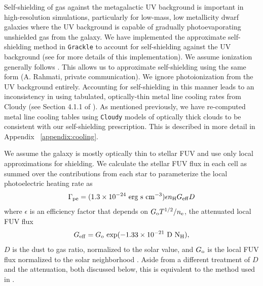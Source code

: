 \documentclass[twocolumn]{aastex61}
\begin{document}
Self-shielding of gas against the metagalactic UV background is important in high-resolution simulations, particularly for low-mass, low metallicity dwarf galaxies where the UV background is capable of gradually photoevaporating unshielded gas from the galaxy. We have implemented the \citet{Rahmati2013} approximate self-shielding method in \texttt{Grackle} to account for  self-shielding against the UV background (see \citep{GrackleMethod} for more details of this implementation). We assume  ionization generally follows . This allows us to approximate  self-shielding using the same form (A. Rahmati, private communication). We ignore  photoionization from the UV background entirely. Accounting for self-shielding in this manner leads to an inconsistency in using tabulated, optically-thin metal line cooling rates from Cloudy (see Section 4.1.1 of \citet{Hu2017}). As mentioned previously, we have re-computed metal line cooling tables using \texttt{Cloudy} models of optically thick clouds to be consistent with our self-shielding prescription. This is described in more detail in Appendix ~\ref{appendix:cooling}. 


We assume the galaxy is mostly optically thin to stellar FUV and use only local approximations for shielding.  We calculate the stellar FUV flux in each cell as summed over the contributions from each star to parameterize the local photoelectric heating rate as \citep{BakesTielens1994,Wolfire2003,Bergin2004}
\begin{equation}
\label{eq:PE}
\Gamma_{\rm pe} = (1.3 \times 10^{-24} \mbox{~erg~s~cm}^{-3}) \epsilon n_{\rm H} G_{\rm eff} D 
\end{equation}
where $\epsilon$ is an efficiency factor that depends on $G_{\rm{o}} T^{1/2} /n_{\rm{e}}$, the attenuated local FUV flux \begin{equation} G_{\rm eff} = G_{\rm o}~\rm{exp}(-1.33\times10^{-21}~D~N_{\rm H}), \end{equation} $D$ is the dust to gas ratio, normalized to the solar value, and $G_{\rm o}$ is the local FUV flux normalized to the solar neighborhood \citep{Habing1968}. Aside from a different treatment of $D$ and the attenuation, both discussed below, this is equivalent to the method used in \citet{Hu2016,Hu2017}.
\end{document}
